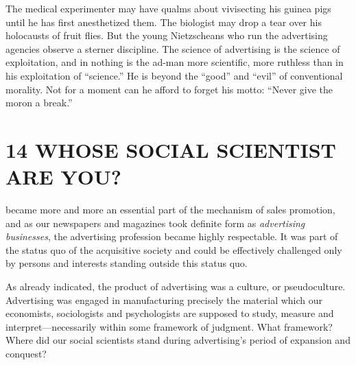 \documentclass[openany,nobib]{tufte-book}
\let\oldchapter\chapter
\def\chapter{%
  \setcounter{footnote}{0}%
  \oldchapter
}
\begin{document}
The medical experimenter may have qualms about vivisecting his guinea
pigs until he has first anesthetized them. The biologist may drop a tear
over his holocausts of fruit flies. But the young Nietzscheans who run
the advertising agencies observe a sterner discipline. The science of
advertising is the science of exploitation, and in nothing is the ad-man
more scientific, more ruthless than in his exploitation of ``science.''
He is beyond the ``good'' and ``evil'' of conventional morality. Not for
a moment can he afford to forget his motto: ``Never give the moron a
break.''



\chapter[14 \hspace*{1mm} WHOSE SOCIAL SCIENTIST ARE YOU?]{14 WHOSE SOCIAL SCIENTIST ARE YOU?}

 became more and more an essential part of the mechanism
of sales promotion, and as our newspapers and magazines took definite
form as \emph{advertising businesses}, the advertising profession became
highly respectable. It was part of the status quo of the acquisitive
society and could be effectively challenged only by persons and
interests standing outside this status quo.

As already indicated, the product of advertising was a culture, or
pseudoculture. Advertising was engaged in manufacturing precisely the
material which our economists, sociologists and psychologists are
supposed to study, measure and interpret---necessarily within some
framework of judgment. What framework? Where did our social scientists
stand during advertising's period of expansion and conquest?
\end{document}
